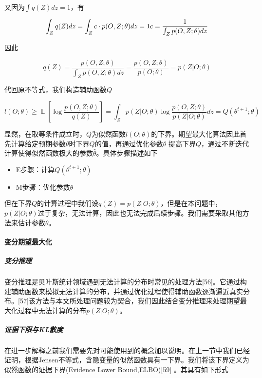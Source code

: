 \documentclass[
]{article}
\begin{document}
又因为\(\int q(Z)dz=1\)，有

\[\int_Z q(Z)dz=\int_Z c\cdot p(O,Z;\theta)dz=1\\
c=\frac{1}{\int_Zp(O,Z;\theta)dz}\]

因此

\[q(Z)=\frac{p(O,Z;\theta)}{\int_Zp(O,Z;\theta)dz}=\frac{p(O,Z;\theta)}{p(O;\theta)}=p(Z|O;\theta)\]

代回原不等式，我们构造辅助函数\(Q\)

\[l(O;\theta) \geq  \mathop{\mathbb{E}}[\log\frac{p(O,Z;\theta)}{q(Z)}]=\int_Zp(Z|O;\theta)\log \frac{p(O,Z;\theta)}{p(Z|O;\theta)}dz=Q(\theta^{t+1};\theta)\]

显然，在取等条件成立时，\(Q\)为似然函数\(l(O;\theta)\)的下界。期望最大化算法因此首先计算给定预期参数\(\theta\)时下界\(Q\)的值，再通过优化参数\(\theta\)
提高下界\(Q\)，通过不断迭代计算使得似然函数极大的参数\(\hat{\theta}\)。具体步骤描述如下

\begin{itemize}
\item
  E步骤：计算\(Q(\theta^{t+1};\theta)\)
\item
  M步骤：优化参数\(\theta\)
\end{itemize}

但在下界\(Q\)的计算过程中我们设\(q(Z)=p(Z|O;\theta)\)，但是在本问题中，\(p(Z|O;\theta)\)过于复杂，无法计算，因此也无法完成后续步骤。我们需要采取其他方法来估计参数\(\theta\)。

\hypertarget{ux53d8ux5206ux671fux671bux6700ux5927ux5316}{%
\paragraph{变分期望最大化}\label{ux53d8ux5206ux671fux671bux6700ux5927ux5316}}

\hypertarget{ux53d8ux5206ux63a8ux7406}{%
\subparagraph{变分推理}\label{ux53d8ux5206ux63a8ux7406}}

变分推理是贝叶斯统计领域遇到无法计算的分布时常见的处理方法{[}56{]}。它通过构建辅助函数来模拟无法计算的分布，并通过优化过程使得辅助函数逐渐逼近真实分布。{[}57{]}该方法与本文所处理问题较为契合，我们因此结合变分推理来处理期望最大化过程中无法计算的分布\(p(Z|O;\theta)\)。

\hypertarget{ux8bc1ux636eux4e0bux9650ux4e0eklux6563ux5ea6}{%
\subparagraph{证据下限与KL散度}\label{ux8bc1ux636eux4e0bux9650ux4e0eklux6563ux5ea6}}

在进一步解释之前我们需要先对可能使用到的概念加以说明。在上一节中我们已经证明，根据Jensen不等式，含隐变量的似然函数具有一下界。我们将该下界定义为似然函数的证据下界(Evidence
Lower Bound,ELBO){[}59{]} 。其具有如下形式
\end{document}
